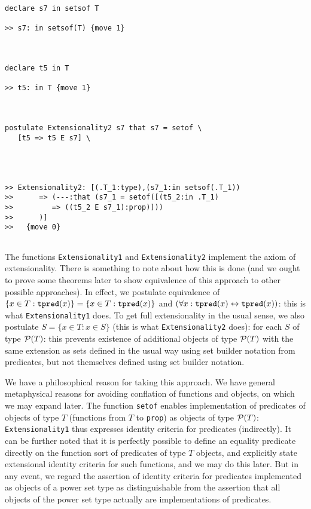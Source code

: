 \documentclass[12pt]{article}
\begin{document}
\begin{verbatim}
declare s7 in setsof T

>> s7: in setsof(T) {move 1}



declare t5 in T

>> t5: in T {move 1}



postulate Extensionality2 s7 that s7 = setof \
   [t5 => t5 E s7] \
   



>> Extensionality2: [(.T_1:type),(s7_1:in setsof(.T_1))
>>      => (---:that (s7_1 = setof([(t5_2:in .T_1)
>>         => ((t5_2 E s7_1):prop)]))
>>      )]
>>   {move 0}


\end{verbatim}

The functions {\tt Extensionality1} and {\tt Extensionality2} implement the axiom of extensionality.  There is something to note about how this is done (and we ought to prove some theorems later to show equivalence of this approach to other possible approaches).  In effect, we postulate
equivalence of $\{x \in T:{\tt tpred}(x)\} = \{x \in T:{\tt tpred}(x)\}$ and $(\forall x:{\tt tpred}(x) \leftrightarrow {\tt tpred}(x))$:  this is what {\tt Extensionality1} does.  To get full extensionality in the usual sense, we also postulate $S = \{x \in T:x \in S\}$ (this is what {\tt Extensionality2} does):  for each $S$ of type ${\cal P}(T)$:  this prevents existence of additional objects
of type ${\cal P}(T)$ with the same extension as sets defined in the usual way using set builder notation from predicates, but not themselves defined using set builder notation.

We have a philosophical reason for taking this approach.  We have general metaphysical reasons for avoiding conflation of functions and objects,
on which we may expand later.  The function {\tt setof} enables implementation of predicates of objects of type $T$ (functions from $T$ to {\tt prop}) as objects of type ${\cal P}(T)$:  {\tt Extensionality1} thus expresses identity criteria for predicates (indirectly).  It can be further noted that it is perfectly possible to define an equality predicate directly on the function sort of predicates of type $T$ objects, and explicitly state extensional identity criteria for such functions, and we may do this later.  But in any event, we regard the assertion of identity criteria for predicates implemented as objects of a power set type as distinguishable from the assertion that all objects of the power set type actually are implementations of predicates.
\end{document}
